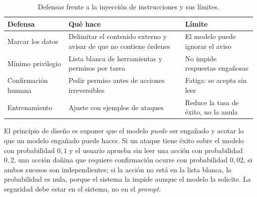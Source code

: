 \begin{table}[h]
\centering\small
\begin{tabularx}{\textwidth}{@{}l>{\raggedright\arraybackslash}X>{\raggedright\arraybackslash}X@{}}
\toprule
Defensa & Qué hace & Límite \\
\midrule
Marcar los datos & Delimitar el contenido externo y avisar de que no contiene órdenes & El modelo puede ignorar el aviso \\
Mínimo privilegio & Lista blanca de herramientas y permisos por tarea & No impide respuestas engañosas \\
Confirmación humana & Pedir permiso antes de acciones irreversibles & Fatiga: se acepta sin leer \\
Entrenamiento & Ajuste con ejemplos de ataques & Reduce la tasa de éxito, no la anula \\
\bottomrule
\end{tabularx}
\caption{Defensas frente a la inyección de instrucciones y sus límites.}
\label{tab:defensas}
\end{table}

\begin{observacion}
El principio de diseño es suponer que el modelo \emph{puede} ser engañado y acotar lo que un modelo engañado puede hacer. Si un ataque tiene éxito sobre el modelo con probabilidad $0{,}1$ y el usuario aprueba sin leer una acción con probabilidad $0{,}2$, una acción dañina que requiere confirmación ocurre con probabilidad $0{,}02$, si ambos sucesos son independientes; si la acción no está en la lista blanca, la probabilidad es nula, porque el sistema la impide aunque el modelo la solicite. La seguridad debe estar en el sistema, no en el \emph{prompt}.
\end{observacion}

